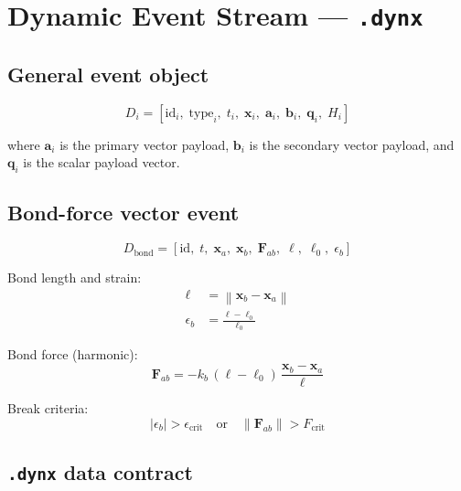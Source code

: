 \documentclass[11pt, a4paper, oneside]{article}
\newcommand{\xvec}{\mathbf{x}}
\newcommand{\Fvec}{\mathbf{F}}
\newcommand{\avec}{\mathbf{a}}
\newcommand{\norm}[1]{\left\|#1\right\|}
\begin{document}
\section{Dynamic Event Stream --- \texttt{.dynx}}
\label{sec:dynx}

\subsection{General event object}

\begin{equation}
  D_i = [\mathrm{id}_i,\; \mathrm{type}_i,\; t_i,\; \xvec_i,\;
          \avec_i,\; \mathbf{b}_i,\; \mathbf{q}_i,\; H_i]
  \label{eq:dynx_event}
\end{equation}

where $\avec_i$ is the primary vector payload, $\mathbf{b}_i$ is the
secondary vector payload, and $\mathbf{q}_i$ is the scalar payload vector.

\subsection{Bond-force vector event}

\begin{equation}
  D_{\mathrm{bond}} = [\mathrm{id},\; t,\; \xvec_a,\; \xvec_b,\;
                        \Fvec_{ab},\; \ell,\; \ell_0,\; \epsilon_b]
  \label{eq:bond_event}
\end{equation}

Bond length and strain:
\begin{align}
  \ell      &= \norm{\xvec_b - \xvec_a} \label{eq:bond_len} \\
  \epsilon_b &= \frac{\ell - \ell_0}{\ell_0} \label{eq:bond_strain}
\end{align}

Bond force (harmonic):
\begin{equation}
  \Fvec_{ab} = -k_b\,(\ell - \ell_0)\,
               \frac{\xvec_b - \xvec_a}{\ell}
  \label{eq:bond_force}
\end{equation}

Break criteria:
\begin{equation}
  |\epsilon_b| > \epsilon_{\mathrm{crit}}
  \quad\text{or}\quad
  \norm{\Fvec_{ab}} > F_{\mathrm{crit}}
  \label{eq:bond_break}
\end{equation}

\subsection{\texttt{.dynx} data contract}
\end{document}
